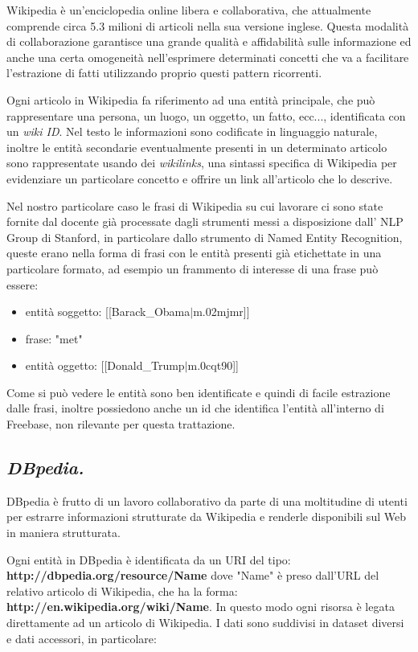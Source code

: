 \documentclass[10pt,a4paper,twocolumn]{article}
\begin{document}
Wikipedia è un'enciclopedia online libera e collaborativa, che attualmente comprende circa 5.3 milioni di articoli nella sua versione inglese. Questa modalità di collaborazione garantisce una grande qualità e affidabilità sulle informazione ed anche una certa omogeneità nell'esprimere determinati concetti che va a facilitare l'estrazione di fatti utilizzando proprio questi pattern ricorrenti.
 
Ogni articolo in Wikipedia fa riferimento ad una entità principale, che può rappresentare una persona, un luogo, un oggetto, un fatto, ecc..., identificata con un \textit{wiki ID}. Nel testo le informazioni sono codificate in linguaggio naturale, inoltre le entità secondarie eventualmente presenti in un determinato articolo sono rappresentate usando dei \textit{wikilinks}, una sintassi specifica di Wikipedia per evidenziare un particolare concetto e offrire un link all'articolo che lo descrive.

Nel nostro particolare caso le frasi di Wikipedia su cui lavorare ci sono state fornite dal docente già processate dagli strumenti messi a disposizione dall' NLP Group di Stanford, in particolare dallo strumento di Named Entity Recognition, queste erano nella forma di frasi con le entità presenti già etichettate in una particolare formato, ad esempio un frammento di interesse di una frase può essere:

\begin{itemize}
	\item entità soggetto: [[Barack\_Obama$|$m.02mjmr]]
	\item frase: "met"
	\item entità oggetto: [[Donald\_Trump$|$m.0cqt90]]
\end{itemize}

Come si può vedere le entità sono ben identificate e quindi di facile estrazione dalle frasi, inoltre possiedono anche un id che identifica l'entità all'interno di Freebase, non rilevante per questa trattazione.

\subsection*{\textit{DBpedia.}}

DBpedia è frutto di un lavoro collaborativo da parte di una moltitudine di utenti per estrarre informazioni strutturate da Wikipedia e renderle disponibili sul Web in maniera strutturata.

Ogni entità in DBpedia è identificata da un URI del tipo:
\bigbreak
\textbf{http://dbpedia.org/resource/Name}
\bigbreak
dove "Name" è preso dall'URL del relativo articolo di Wikipedia, che ha la forma:
\bigbreak
\textbf{http://en.wikipedia.org/wiki/Name}.
\bigbreak
In questo modo ogni risorsa è legata direttamente ad un articolo di Wikipedia. I dati sono suddivisi in dataset diversi e dati accessori, in particolare:
\end{document}

